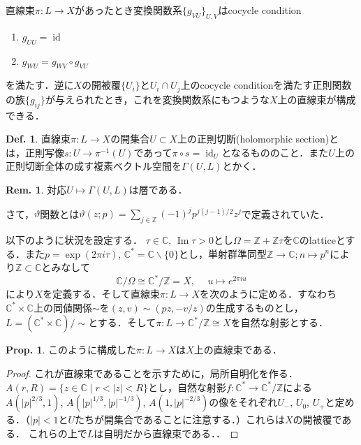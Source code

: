 \documentclass[dvipdfmx,b5paper,papersize]{jsarticle}
\theoremstyle{definition}
\newtheorem{prop}[thm]{Prop.}
\newtheorem{defi}[thm]{Def.}
\newtheorem{rem}[thm]{Rem.}
\begin{document}
直線束$\pi \colon L \to X$があったとき変換関数系$\{g_{VU}\}_{U,V}$はcocycle condition
\begin{enumerate}
  \item $g_{UU}={\operatorname{id}}$
  \item $g_{WU}=g_{WV}\circ g_{VU}$
\end{enumerate}
を満たす．逆に$X$の開被覆$\{U_i\}$と$U_i \cap U_j$上のcocycle conditionを満たす正則関数の族$\{g_{ij}\}$が与えられたとき，これを変換関数系にもつような$X$上の直線束が構成できる．

\begin{defi}
  直線束$\pi \colon L \to X$の開集合$U \subset X$上の正則切断(holomorphic section)とは，正則写像$s \colon U \to \pi^{-1}(U)$であって$\pi \circ s={\operatorname{id}}_U$となるもののこと．また$U$上の正則切断全体の成す複素ベクトル空間を$\Gamma(U,L)$とかく．
\end{defi}

\begin{rem}
  対応$U \mapsto \Gamma(U,L)$は層である．
\end{rem}

さて，$\vartheta$関数とは$\vartheta(z;p)=\sum_{j \in \mathbb{Z}} (-1)^j p^{j(j-1)/2} z^j$で定義されていた．




以下のように状況を設定する．
$\tau \in \mathbb{C}$, $\operatorname{Im} \tau >0$とし$\Omega=\mathbb{Z}+\mathbb{Z}\tau$を$\mathbb{C}$のlatticeとする．また$p=\exp{(2\pi i\tau)}$, $\mathbb{C}^*=\mathbb{C}\backslash \{0\}$とし，単射群準同型$\mathbb{Z} \to \mathbb{C}; n \mapsto p^n$により$\mathbb{Z} \subset \mathbb{C}$とみなして
\[
\mathbb{C}/\Omega \cong \mathbb{C}^*/\mathbb{Z}=X, \hspace{15pt} u \longmapsto e^{2\pi i u}
\]
により$X$を定義する．そして直線束$\pi \colon L \to X$を次のように定める．すなわち$\mathbb{C}^* \times \mathbb{C}$上の同値関係$\sim$を$(z,v)\sim (pz,-v/z)$の生成するものとし，$L=(\mathbb{C}^* \times \mathbb{C})/{\sim}$とする．そして$\pi \colon L \to \mathbb{C}^*/\mathbb{Z} \cong X$を自然な射影とする．


\begin{prop}
  このように構成した$\pi \colon L \to X$は$X$上の直線束である．
\end{prop}
\begin{proof}
これが直線束であることを示すために，局所自明化を作る．
$A(r,R)=\{z \in \mathbb{C}\mid r<|z|<R\}$とし，自然な射影$f \colon \mathbb{C}^* \to \mathbb{C}^*/\mathbb{Z}$による$A(|p|^{2/3},1)$, $A(|p|^{1/3},|p|^{-1/3})$, $A(1,|p|^{-2/3})$の像をそれぞれ$U_{-}$, $U_0$, $U_{+}$と定める．（$|p|<1$と$U$たちが開集合であることに注意する．）これらは$X$の開被覆である．
これらの上で$L$は自明だから直線束である．．
\end{proof}
\end{document}
